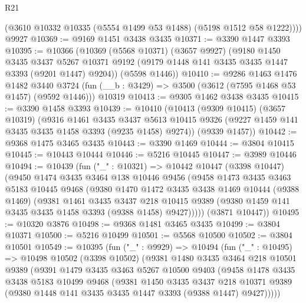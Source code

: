 \begin{lexlean}{R21}
\begin{coremodule}
        (@3610 @10332 @10335 (@5554 @1499 @53 @1488) (@5198 @1512 @58 @1222))))
    @9927
@10369 := @9169 @1451 @3438 @3435
@10371 := @3390 @1447 @3393
@10395 := @10366
    (@10369
      (@5568 @10371)
      (@3657 @9927)
      (@9180
        @1450
        @3435
        @3437
        @5267
        @10371
        @9192
        (@9179 @1448 @141 @3435 @3435 @1447 @3393 (@9201 @1447) @9204))
      (@5598 @1446))
@10410 := @9286
    @1463
    @1476
    @1482
    @3440
    @3724
    (fun (__b : @3429) => @3500 (@3612 (@7595 @1468 @53 @1457) (@9592 @1446)))
    @10319
@10413 := @9305 @1462 @3438 @3435
@10415 := @3390 @1458 @3393
@10439 := @10410
    (@10413
      (@9309 @10415)
      (@3657 @10319)
      (@9316
        @1461
        @3435
        @3437
        @5613
        @10415
        @9326
        (@9227 @1459 @141 @3435 @3435 @1458 @3393 (@9235 @1458) @9274))
      (@9339 @1457))
@10442 := @9368 @1475 @3465 @3435
@10443 := @3390 @1469
@10444 := @3804 @10415
@10445 := @10443 @10444
@10446 := @5216 @10445
@10447 := @3989 @10446
@10494 := @10439
    (fun ("_" : @10321) =>
    @10442
      @10447
      (@3398 @10447)
      (@9450
        @1474
        @3435
        @3464
        @138
        @10446
        @9456
        (@9458
          @1473
          @3435
          @3463
          @5183
          @10445
          @9468
          (@9380
            @1470
            @1472
            @3435
            @3438
            @1469
            @10444
            (@9388 @1469)
            (@9381
              @1461
              @3435
              @3437
              @218
              @10415
              @9389
              (@9380 @1459 @141 @3435 @3435 @1458 @3393 (@9388 @1458) @9427)))))
      (@3871 @10447))
@10495 := @10320 @3876
@10498 := @9368 @1481 @3465 @3435
@10499 := @3804 @10371
@10500 := @5216 @10499
@10501 := @5568 @10500
@10502 := @3804 @10501
@10549 := @10395
    (fun ("_" : @9929) =>
    @10494
      (fun ("_" : @10495) =>
      @10498
        @10502
        (@3398 @10502)
        (@9381
          @1480
          @3435
          @3464
          @218
          @10501
          @9389
          (@9391
            @1479
            @3435
            @3463
            @5267
            @10500
            @9403
            (@9458
              @1478
              @3435
              @3438
              @5183
              @10499
              @9468
              (@9381
                @1450
                @3435
                @3437
                @218
                @10371
                @9389
                (@9380 @1448 @141 @3435 @3435 @1447 @3393 (@9388 @1447) @9427)))))

\end{coremodule}
\end{lexlean}
